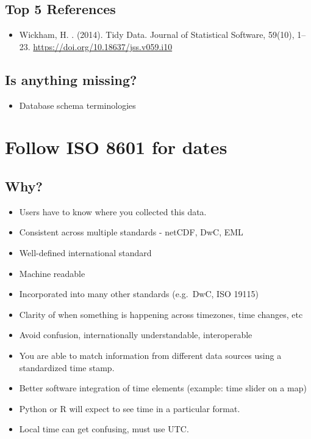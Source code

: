 \documentclass[
  oneside]{book}
\providecommand{\tightlist}{%
  \setlength{\itemsep}{0pt}\setlength{\parskip}{0pt}}
\begin{document}
\hypertarget{top-5-references-1}{%
\subsection{Top 5 References}\label{top-5-references-1}}

\begin{itemize}
\tightlist
\item
  Wickham, H. . (2014). Tidy Data. Journal of Statistical Software, 59(10), 1--23. \url{https://doi.org/10.18637/jss.v059.i10}
\end{itemize}

\hypertarget{is-anything-missing-1}{%
\subsection{Is anything missing?}\label{is-anything-missing-1}}

\begin{itemize}
\tightlist
\item
  Database schema terminologies
\end{itemize}

\hypertarget{follow-iso-8601-for-dates}{%
\section{Follow ISO 8601 for dates}\label{follow-iso-8601-for-dates}}

\hypertarget{why-2}{%
\subsection{Why?}\label{why-2}}

\begin{itemize}
\tightlist
\item
  Users have to know where you collected this data.
\item
  Consistent across multiple standards - netCDF, DwC, EML
\item
  Well-defined international standard
\item
  Machine readable
\item
  Incorporated into many other standards (e.g.~DwC, ISO 19115)
\item
  Clarity of when something is happening across timezones, time changes, etc
\item
  Avoid confusion, internationally understandable, interoperable
\item
  You are able to match information from different data sources using a standardized time stamp.
\item
  Better software integration of time elements (example: time slider on a map)
\item
  Python or R will expect to see time in a particular format.\\
\item
  Local time can get confusing, must use UTC.
\end{itemize}
\end{document}

